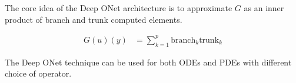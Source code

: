 \documentclass[book.tex]{subfiles}
\begin{document}
The core idea of the Deep ONet architecture is to approximate $G$ as an inner product of branch and trunk computed elements.

\begin{align}
G(u)(y) &= \sum_{k=1}^p \textrm{branch}_k \textrm{trunk}_k
\end{align}

The Deep ONet technique can be used for both ODEs and PDEs with different choice of operator.




\end{document}
